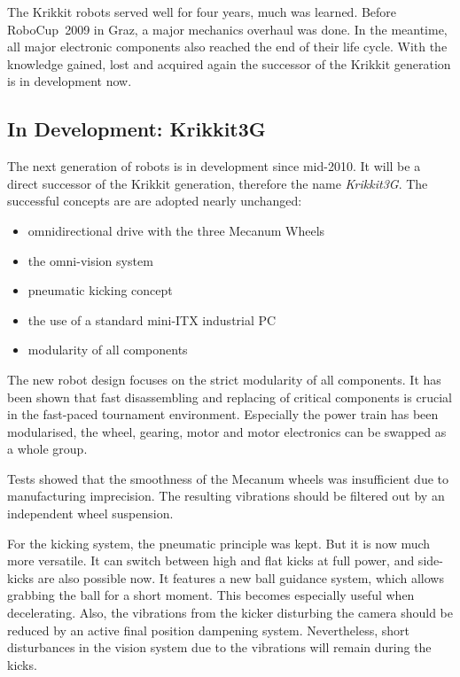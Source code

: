 \documentclass[12pt,a4paper]{article}
\begin{document}
The Krikkit robots served well for four years, much was learned.
Before RoboCup~2009 in Graz, a major mechanics overhaul was done.
In the meantime, all major electronic components also reached the end of their life cycle.
With the knowledge gained, lost and acquired again the successor of the Krikkit generation is in development now.
    

\subsection{In Development: Krikkit3G}

The next generation of robots is in development since mid-2010.
It will be a direct successor of the Krikkit generation, therefore the name \emph{Krikkit3G}.
The successful concepts are are adopted nearly unchanged:

\begin{itemize}
  \item omnidirectional drive with the three Mecanum Wheels
  \item the omni-vision system
  \item pneumatic kicking concept
  \item the use of a standard mini-ITX industrial PC
  \item modularity of all components
\end{itemize}

The new robot design focuses on the strict modularity of all components.
It has been shown that fast disassembling and replacing of critical components is crucial in the fast-paced tournament environment.
Especially the power train has been modularised, the wheel, gearing, motor and motor electronics can be swapped as a whole group.

Tests showed that the smoothness of the Mecanum wheels was insufficient due to manufacturing imprecision.
The resulting vibrations should be filtered out by an independent wheel suspension.


For the kicking system, the pneumatic principle was kept.
But it is now much more versatile. 
It can switch between high and flat kicks at full power, and side-kicks are also possible now.
It features a new ball guidance system, which allows grabbing the ball for a short moment.
This becomes especially useful when decelerating.
Also, the vibrations from the kicker disturbing the camera should be reduced by an active final position dampening system.
Nevertheless, short disturbances in the vision system due to the vibrations will remain during the kicks.
\end{document}
